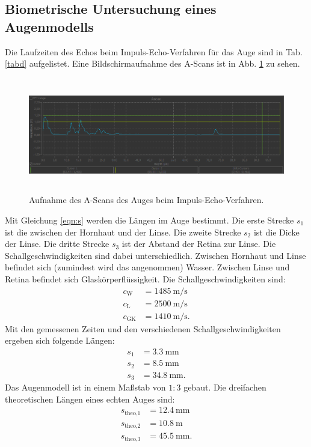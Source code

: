 \subsection{Biometrische Untersuchung eines Augenmodells}
Die Laufzeiten des Echos beim Impuls-Echo-Verfahren für das Auge
sind in Tab. \ref{tabd} aufgelistet. Eine Bildschirmaufnahme des
A-Scans ist in Abb. \ref{fig:auge} zu sehen.

\begin{figure}
 \centering
 \includegraphics[width=15cm, height=5cm]{build/Auge.png}
 \caption{Aufnahme des A-Scans des Auges beim Impuls-Echo-Verfahren.}
 \label{fig:auge}
\end{figure}
\noindent Mit Gleichung \eqref{eqn:s} werden die Längen im Auge bestimmt.
Die erste Strecke $s_1$ ist die zwischen der Hornhaut und der Linse.
Die zweite Strecke $s_2$ ist die Dicke der Linse. Die dritte Strecke $s_3$ ist der Abstand
der Retina zur Linse.
Die Schallgeschwindigkeiten sind dabei unterschiedlich.
Zwischen Hornhaut und Linse befindet sich (zumindest wird das angenommen)
Wasser. Zwischen Linse und Retina befindet sich Glaskörperflüssigkeit.
Die Schallgeschwindigkeiten \cite{c} \cite{US1} sind:
\begin{align*}
    c_{\text{W}} &= \SI{1485}{\meter\per\second} \\
    c_{\text{L}} &= \SI{2500}{\meter\per\second} \\
    c_{\text{GK}} &= \SI{1410}{\meter\per\second}.
\end{align*}
Mit den gemessenen Zeiten und den verschiedenen Schallgeschwindigkeiten
ergeben sich folgende Längen:
\begin{align*}
    s_1 &= \SI{3.3}{\milli\meter} \\
    s_2 &= \SI{8.5}{\milli\meter} \\
    s_3 &= \SI{34.8}{\milli\meter}.
\end{align*}
Das Augenmodell ist in einem Maßstab von $1:3$ gebaut.
Die dreifachen theoretischen Längen eines echten Auges \cite{auge} sind:
\begin{align*}
    s_{\text{theo,1}} &= \SI{12.4}{\milli\meter} \\
    s_{\text{theo,2}} &= \SI{10.8}{\meter} \\
    s_{\text{theo,3}} &= \SI{45.5}{\milli\meter}.
\end{align*}
